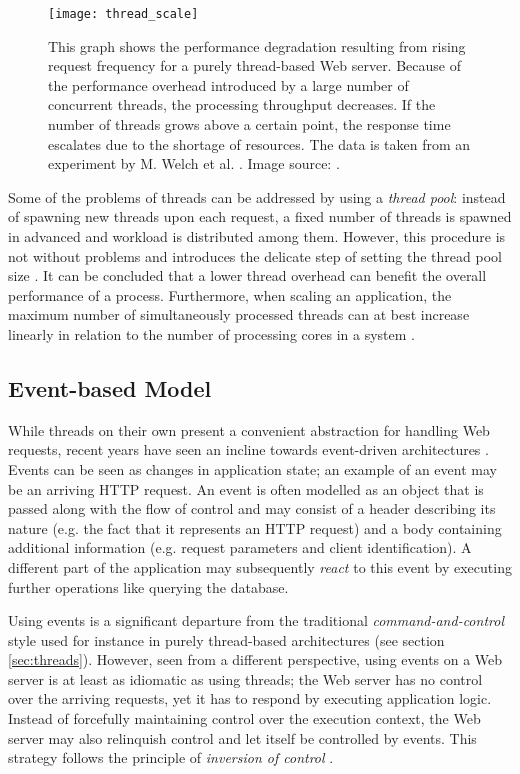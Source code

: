 \begin{figure}
\centering\small
\setlength{\tabcolsep}{0mm}
  \texttt{[image: thread\_scale]}
\caption{
This graph shows the performance degradation resulting from rising request frequency for a purely thread-based Web server. Because of the performance overhead introduced by a large number of concurrent threads, the processing throughput decreases. If the number of threads grows above a certain point, the response time escalates due to the shortage of resources. The data is taken from an experiment by M. Welch et al. \cite{Welsh2001}. Image source: \cite{Welsh2001}.
}
\label{fig:thread_scale}
\end{figure}

Some of the problems of threads can be addressed by using a \textit{thread pool}: instead of spawning new threads upon each request, a fixed number of threads is spawned in advanced and workload is distributed among them. However, this procedure is not without problems and introduces the delicate step of setting the thread pool size \cite{threadpools}. It can be concluded that a lower thread overhead can benefit the overall performance of a process. Furthermore, when scaling an application, the maximum number of simultaneously processed threads can at best increase linearly in relation to the number of processing cores in a system \cite{McCool}.

\subsection{Event-based Model}
\label{lab:events}
While threads on their own present a convenient abstraction for handling Web requests, recent years have seen an incline towards event-driven architectures \cite{Tilkov2010}. Events can be seen as changes in application state; an example of an event may be an arriving HTTP request. An event is often modelled as an object that is passed along with the flow of control and may consist of a header describing its nature (e.g. the fact that it represents an HTTP request) and a body containing additional information (e.g. request parameters and client identification). A different part of the application may subsequently \textit{react} to this event by executing further operations like querying the database.

Using events is a significant departure from the traditional \textit{command-and-control} style used for instance in purely thread-based architectures (see section \ref{sec:threads}). However, seen from a different perspective, using events on a Web server is at least as idiomatic as using threads; the Web server has no control over the arriving requests, yet it has to respond by executing application logic. Instead of forcefully maintaining control over the execution context, the Web server may also relinquish control and let itself be controlled by events. This strategy follows the principle of \textit{inversion of control} \cite{Hohpe2006}. 

